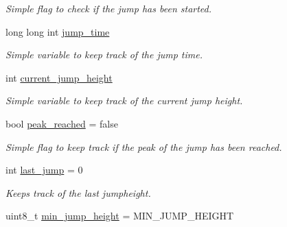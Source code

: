 \begin{DoxyCompactItemize}
\begin{DoxyCompactList}\small\item\em Simple flag to check if the jump has been started. \end{DoxyCompactList}\item 
long long int \hyperlink{classlight__board_aacfb2a17ac3d239cbbc93ae461b13fc3}{jump\+\_\+time}\hypertarget{classlight__board_aacfb2a17ac3d239cbbc93ae461b13fc3}{}\label{classlight__board_aacfb2a17ac3d239cbbc93ae461b13fc3}

\begin{DoxyCompactList}\small\item\em Simple variable to keep track of the jump time. \end{DoxyCompactList}\item 
int \hyperlink{classlight__board_ad605ca802da24902e1d3c7134f07811f}{current\+\_\+jump\+\_\+height}\hypertarget{classlight__board_ad605ca802da24902e1d3c7134f07811f}{}\label{classlight__board_ad605ca802da24902e1d3c7134f07811f}

\begin{DoxyCompactList}\small\item\em Simple variable to keep track of the current jump height. \end{DoxyCompactList}\item 
bool \hyperlink{classlight__board_afcf221a19180e88a1844aceabf646c87}{peak\+\_\+reached} = false\hypertarget{classlight__board_afcf221a19180e88a1844aceabf646c87}{}\label{classlight__board_afcf221a19180e88a1844aceabf646c87}

\begin{DoxyCompactList}\small\item\em Simple flag to keep track if the peak of the jump has been reached. \end{DoxyCompactList}\item 
int \hyperlink{classlight__board_aa562896a357e63d2627baf74a7874785}{last\+\_\+jump} = 0\hypertarget{classlight__board_aa562896a357e63d2627baf74a7874785}{}\label{classlight__board_aa562896a357e63d2627baf74a7874785}

\begin{DoxyCompactList}\small\item\em Keeps track of the last jumpheight. \end{DoxyCompactList}\item 
uint8\+\_\+t \hyperlink{classlight__board_a08644436f6e58c565ec2621094c1f05b}{min\+\_\+jump\+\_\+height} = M\+I\+N\+\_\+\+J\+U\+M\+P\+\_\+\+H\+E\+I\+G\+HT\hypertarget{classlight__board_a08644436f6e58c565ec2621094c1f05b}{}\label{classlight__board_a08644436f6e58c565ec2621094c1f05b}


\end{DoxyCompactItemize}
